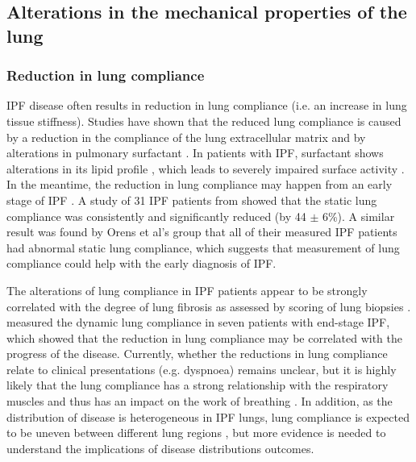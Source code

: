\subsection{Alterations in the mechanical properties of the lung} \label{MechanicalAlteration}
\subsubsection{Reduction in lung compliance}
IPF disease often results in reduction in lung compliance (i.e. an increase in lung tissue stiffness). Studies have shown that the reduced lung compliance is caused by a reduction in the compliance of the lung extracellular matrix and by alterations in pulmonary surfactant \citep{plantier2018physiology}. In patients with IPF, surfactant shows alterations in its lipid profile \citep{gunther1999surfactant, schmidt2002altered}, which leads to severely impaired surface activity \citep{gunther1999surfactant}. In the meantime, the reduction in lung compliance may happen from an early stage of IPF \citep{plantier2018physiology}. A study of 31 IPF patients from \cite{zielonka2010angiogenic} showed that the static lung compliance was consistently and significantly reduced (by 44 $\pm$ 6\%). A similar result was found by Orens et al's group \citep{orens1995sensitivity} that all of their measured IPF patients had abnormal static lung compliance, which suggests that measurement of lung compliance could help with the early diagnosis of IPF.

The alterations of lung compliance in IPF patients appear to be strongly correlated with the degree of lung fibrosis as assessed by scoring of lung biopsies \citep{fulmer1979morphologic,plantier2018physiology}. \cite{nava1999lung} measured the dynamic lung compliance in seven patients with end-stage IPF, which showed that the reduction in lung compliance may be correlated with the progress of the disease. Currently, whether the reductions in lung compliance relate to clinical presentations (e.g. dyspnoea) remains unclear, but it is highly likely that the lung compliance has a strong relationship with the respiratory muscles and thus has an impact on the work of breathing \citep{plantier2018physiology}. In addition, as the distribution of disease is heterogeneous in IPF lungs, lung compliance is expected to be uneven between different lung regions \citep{organ2015structural}, but more evidence is needed to understand the implications of disease distributions outcomes.

